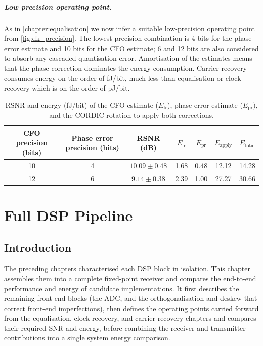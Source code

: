 \documentclass[12pt,a4paper]{report}
\begin{document}
\paragraph{Low precision operating point.} As in \cref{chapter:equalisation} we now infer a suitable low-precision operating point from \cref{fig:dk_precision}. The lowest precision combination is 4 bits for the phase error estimate and 10 bits for the CFO estimate; 6 and 12 bits are also considered to absorb any cascaded quantisation error. Amortisation of the estimates means that the phase correction dominates the energy consumption. Carrier recovery consumes energy on the order of fJ/bit, much less than equalisation or clock recovery which is on the order of pJ/bit.
\begin{table}[H]
    \centering
    \small
    \begin{tabular}{ccccccc}
        \toprule
        CFO precision (bits) & Phase error precision (bits) & RSNR (dB) & $E_\mathrm{fr}$ & $E_\mathrm{pr}$ & $E_\mathrm{apply}$ & $E_\mathrm{total}$ \\
        \midrule
        10 & 4 & $10.09\pm0.48$ & 1.68 & 0.48 & 12.12 & 14.28 \\
        12 & 6 & $9.14\pm0.38$ & 2.39 & 1.00 & 27.27 & 30.66 \\
        \bottomrule
    \end{tabular}
    \caption{RSNR and energy (fJ/bit) of the CFO estimate ($E_\mathrm{fr}$), phase error estimate ($E_\mathrm{pr})$, and the CORDIC rotation to apply both corrections.}
    \label{tab:cr_cost}
\end{table}




\chapter{Full DSP Pipeline}\label{chapter:full_pipeline}
\section{Introduction}
The preceding chapters characterised each DSP block in isolation. This chapter assembles them into a complete fixed-point receiver and compares the end-to-end performance and energy of candidate implementations. It first describes the remaining front-end blocks (the ADC, and the orthogonalisation and deskew that correct front-end imperfections), then defines the operating points carried forward from the equalisation, clock recovery, and carrier recovery chapters and compares their required SNR and energy, before combining the receiver and transmitter contributions into a single system energy comparison.
\end{document}
